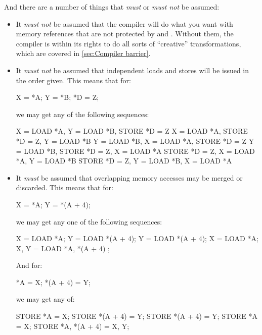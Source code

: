 And there are a number of things that \emph{must} or \emph{must not} be assumed:

\begin{itemize}
 \item It \emph{must not} be assumed that the compiler will do what you want
       with memory references that are not protected by  and
       .
       Without them, the compiler is within its rights to do all sorts of
       ``creative'' transformations, which are covered in
       \cref{sec:Compiler barrier}.

 \item It \emph{must not} be assumed that independent loads and stores will be issued
       in the order given.  This means that for:

       \begin{VerbatimU}
	X = *A; Y = *B; *D = Z;
       \end{VerbatimU}

       we may get any of the following sequences:

       \begin{VerbatimU}
	X = LOAD *A,  Y = LOAD *B,  STORE *D = Z
	X = LOAD *A,  STORE *D = Z, Y = LOAD *B
	Y = LOAD *B,  X = LOAD *A,  STORE *D = Z
	Y = LOAD *B,  STORE *D = Z, X = LOAD *A
	STORE *D = Z, X = LOAD *A,  Y = LOAD *B
	STORE *D = Z, Y = LOAD *B,  X = LOAD *A
       \end{VerbatimU}

 \item It \emph{must} be assumed that overlapping memory accesses may be
       merged or discarded.
       This means that for:

       \begin{VerbatimU}
	X = *A; Y = *(A + 4);
       \end{VerbatimU}

       we may get any one of the following sequences:

       \begin{VerbatimU}
	X = LOAD *A; Y = LOAD *(A + 4);
	Y = LOAD *(A + 4); X = LOAD *A;
	{X, Y} = LOAD {*A, *(A + 4) };
       \end{VerbatimU}

       And for:

       \begin{VerbatimU}
	*A = X; *(A + 4) = Y;
       \end{VerbatimU}

       we may get any of:

       \begin{VerbatimU}
	STORE *A = X; STORE *(A + 4) = Y;
	STORE *(A + 4) = Y; STORE *A = X;
	STORE {*A, *(A + 4) } = {X, Y};
       \end{VerbatimU}
\end{itemize}

